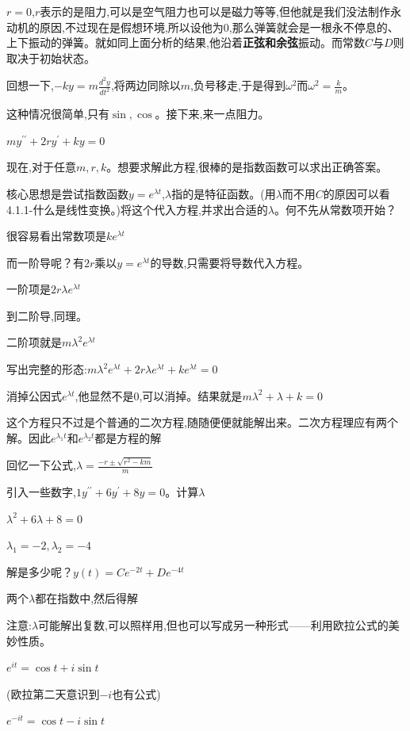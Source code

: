 \documentclass[UTF8]{ctexbook}
\newcommand{\derivative}{^\prime}
\newcommand{\doubleDerivative}{^{\prime\prime}}
\begin{document}
{{{{$r = 0$,$r$表示的是阻力,可以是空气阻力也可以是磁力等等,但他就是我们没法制作永动机的原因,不过现在是假想环境,所以设他为0,那么弹簧就会是一根永不停息的、上下振动的弹簧。就如同上面分析的结果,他沿着{\bfseries 正弦和余弦}振动。而常数$C$与$D$则取决于初始状态。

回想一下,$-ky = m\frac{d^2y}{dt^2}$,将两边同除以$m$,负号移走,于是得到$\omega^2$而$\omega^2 = \frac{k}{m}$。

这种情况很简单,只有$\sin , \cos$。接下来,来一点阻力。

$my\doubleDerivative + 2ry\derivative + ky = 0$

现在,对于任意$m,r,k$。想要求解此方程,很棒的是指数函数可以求出正确答案。

核心思想是尝试指数函数$y = e^{\lambda t}$,$\lambda$指的是特征函数。(用$\lambda$而不用$C$的原因可以看4.1.1-什么是线性变换。)将这个代入方程,并求出合适的$\lambda$。何不先从常数项开始？

很容易看出常数项是$ke^{\lambda t}$

而一阶导呢？有$2r$乘以$y = e^{\lambda t}$的导数,只需要将导数代入方程。

一阶项是$2r\lambda e^{\lambda t}$

到二阶导,同理。

二阶项就是$m\lambda^2e^{\lambda t}$

写出完整的形态:$m\lambda^2e^{\lambda t} + 2r\lambda e^{\lambda t} + ke^{\lambda t} = 0$

消掉公因式$e^{\lambda t}$,他显然不是0,可以消掉。结果就是$m\lambda^2 + \lambda + k= 0$

这个方程只不过是个普通的二次方程,随随便便就能解出来。二次方程理应有两个解。因此$e^{\lambda_1 t}$和$e^{\lambda_2 t}$都是方程的解

回忆一下公式,$\lambda = \frac{-r \pm \sqrt{r^2 - km}}{m}$

引入一些数字,$1y\doubleDerivative + 6y\derivative + 8y = 0$。计算$\lambda$

$\lambda^2 + 6\lambda + 8 = 0$

$\lambda_1 = -2, \lambda_2 = -4$

解是多少呢？$y(t) = Ce^{-2t} + De^{-4t}$

两个$\lambda$都在指数中,然后得解

注意:$\lambda$可能解出复数,可以照样用,但也可以写成另一种形式——利用欧拉公式的美妙性质。

$e^{it} = \cos t + i\sin t$

(欧拉第二天意识到$-i$也有公式)

$e^{-it} = \cos t -i\sin t$

}}}}
\end{document}
